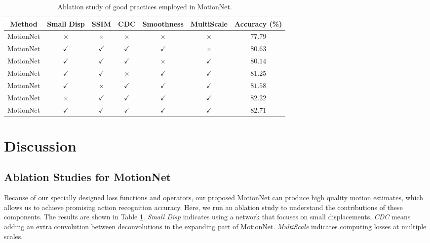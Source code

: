 \documentclass[runningheads]{llncs}
\begin{document}
		\begin{table}[t]
			\begin{center}
				\caption{Ablation study of good practices employed in MotionNet. \label{tab:ablation}}
\begin{tabular}{  c | c | c| c | c | c | c }
						\hline
						Method								  &    Small Disp    &    SSIM    & CDC    &    Smoothness    &    {\color{black}MultiScale} &    Accuracy (\%) \\
						\hline		
						MotionNet							&   $\times$ &    $\times$ &    $\times$ &   $\times$ &   $\times$ & $77.79$       \\		
						MotionNet							&   $\checkmark$ &    $\checkmark$ &    $\checkmark$ &   $\checkmark$ &   $\times$ & {\color{black}$80.63$ }      \\	
						MotionNet							&   $\checkmark$ &    $\checkmark$ &    $\checkmark$ &   $\times$ &   $\checkmark$ & $80.14$       \\		
						MotionNet							&   $\checkmark$ &    $\checkmark$ &    $\times$ &   $\checkmark$ &   $\checkmark$ & $81.25$       \\		
						MotionNet							&   $\checkmark$ &    $\times$ &    $\checkmark$ &   $\checkmark$ &  $\checkmark$ &  $81.58$       \\		
						MotionNet							&   $\times$ &    $\checkmark$ &    $\checkmark$ &   $\checkmark$ &   $\checkmark$ & $82.22$       \\		
						MotionNet							&   $\checkmark$ &    $\checkmark$ &    $\checkmark$ &   $\checkmark$ &   $\checkmark$ & $\mathbf{82.71}$       \\		
						\hline
					\end{tabular}
\end{center}
		\end{table} 
		
		\section{Discussion}
		\label{sec:discussion}
		
		\subsection{Ablation Studies for MotionNet} 
		\label{sec:ablation}
		Because of our specially designed loss functions and operators, our proposed MotionNet can produce high quality motion estimates, which allows us to achieve promising action recognition accuracy. Here, we run an ablation study to understand the contributions of these components. The results are shown in Table \ref{tab:ablation}. \textit{Small Disp} indicates using a network that focuses on small displacements. \textit{CDC} means adding an extra convolution between deconvolutions in the expanding part of MotionNet. {\color{black} \textit{MultiScale} indicates computing losses at multiple scales. }
		
\end{document}
